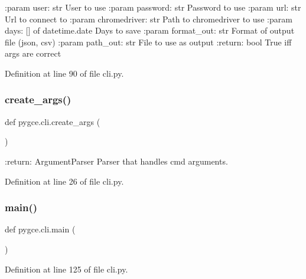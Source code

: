 \begin{DoxyVerb}:param user: str
    User to use
:param password: str
    Password to use
:param url: str
    Url to connect to
:param chromedriver: str
    Path to chromedriver to use
:param days: [] of datetime.date
    Days to save
:param format_out: str
    Format of output file (json, csv)
:param path_out: str
    File to use as output
:return: bool
    True iff args are correct
\end{DoxyVerb}
 

Definition at line 90 of file cli.\+py.

\mbox{\label{namespacepygce_1_1cli_a5734100556cffce34b4b53f9d027080b}} 
\subsubsection{\texorpdfstring{create\+\_\+args()}{create\_args()}}
{\footnotesize\ttfamily def pygce.\+cli.\+create\+\_\+args (\begin{DoxyParamCaption}{ }\end{DoxyParamCaption})}

\begin{DoxyVerb}:return: ArgumentParser
    Parser that handles cmd arguments.
\end{DoxyVerb}
 

Definition at line 26 of file cli.\+py.

\mbox{\label{namespacepygce_1_1cli_a696dc9e135d9815a0d4a889eb94c18fb}} 
\subsubsection{\texorpdfstring{main()}{main()}}
{\footnotesize\ttfamily def pygce.\+cli.\+main (\begin{DoxyParamCaption}{ }\end{DoxyParamCaption})}



Definition at line 125 of file cli.\+py.

\mbox{\label{namespacepygce_1_1cli_a7729e758c25a70a57c0578bd4dde32df}} 
